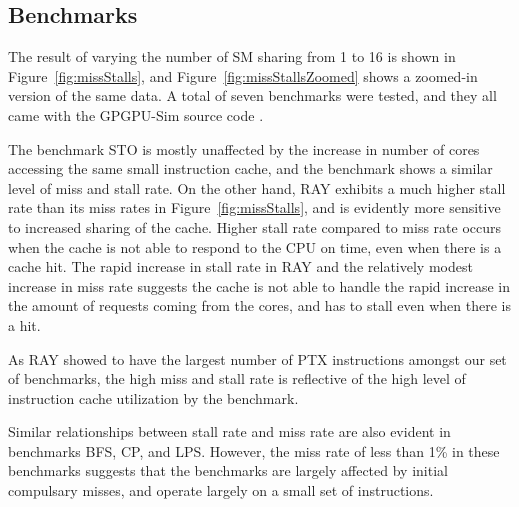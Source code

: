 

\subsection{Benchmarks}
\label{sec:benchmarks}
The result of varying the number of SM sharing from 1 to 16 is shown in Figure~\ref{fig:missStalls}, and Figure~\ref{fig:missStallsZoomed} shows 
a zoomed-in version of the same data. A total of seven benchmarks were
tested, and they all came with the GPGPU-Sim source code \cite{bakhodayuan09}.

The benchmark STO is mostly unaffected by the increase in number of cores
accessing the same small instruction cache, and the benchmark shows a similar
level of miss and stall rate. 
On the other hand, RAY exhibits a much higher stall rate than its miss rates in Figure~\ref{fig:missStalls}, 
and is evidently more sensitive to increased sharing of the cache.
Higher stall rate compared to miss rate occurs when the cache is not able to 
respond to the CPU on time, even when there is a cache hit.
The rapid increase in stall rate in RAY and the relatively modest increase in miss rate 
suggests the cache is not able to handle the rapid increase in the amount of requests coming from the cores,
and has to stall even when there is a hit.

As RAY showed to have the largest number of PTX instructions amongst our set of benchmarks,
the high miss and stall rate is reflective of the high level of instruction cache utilization
by the benchmark. 

Similar relationships between stall rate and miss rate are also evident in 
benchmarks BFS, CP, and LPS. However, the miss rate of less than 1\% in these benchmarks
suggests that the benchmarks are largely affected by initial compulsary misses, and operate
largely on a small set of instructions.

